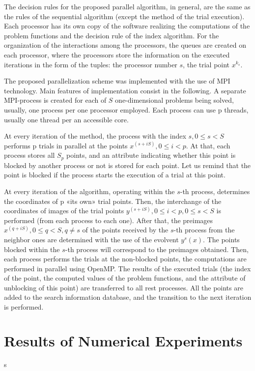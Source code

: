 \documentclass[runningheads]{llncs}
\begin{document}
The decision rules for the proposed parallel algorithm, in general, are the same as the rules of the sequential algorithm (except the method of the trial execution). Each processor has its own copy of the software realizing the computations of the problem functions and the decision rule of the index algorithm. For the organization of the interactions among the processors, the queues are created on each processor, where the processors store the information on the executed iterations in the form of the tuples: the processor number \(s\), the trial point \(x{}^{k_s}\).
\par
The proposed parallelization scheme was implemented with the use of MPI technology. Main features of implementation consist in the following. A separate MPI-process is created for each of \(S\) one-dimensional problems being solved, usually, one process per one processor employed. Each process can use p threads, usually one thread per an accessible core.
\par
At every iteration of the method, the process with the index \(s,0≤ s< S\) performs p trials in parallel at the points \(x^(s+iS),0≤i<p\). At that, each process stores all \(S_p\) points, and an attribute indicating whether this point is blocked by another process or not is stored for each point. Let us remind that the point is blocked if the process starts the execution of a trial at this point.
\par
At every iteration of the algorithm, operating within the \(s\)-th process, determines the coordinates of p «its own» trial points. Then, the interchange of the coordinates of images of the trial points \(y^(s+iS),0≤i<p, 0≤ s< S\) is performed (from each process to each one). After that, the preimages \(x^(q+iS),0≤ q<S,q≠s\) of the points received by the \(s\)-th process from the neighbor ones are determined with the use of the evolvent \(y^s (x)\). The points blocked within the \(s\)-th process will correspond to the preimages obtained. Then, each process performs the trials at the non-blocked points, the computations are performed in parallel using OpenMP. The results of the executed trials (the index of the point, the computed values of the problem functions, and the attribute of unblocking of this point) are transferred to all rest processes. All the points are added to the search information database, and the transition to the next iteration is performed.
\par

\section{Results of Numerical Experiments}
s
\end{document}

